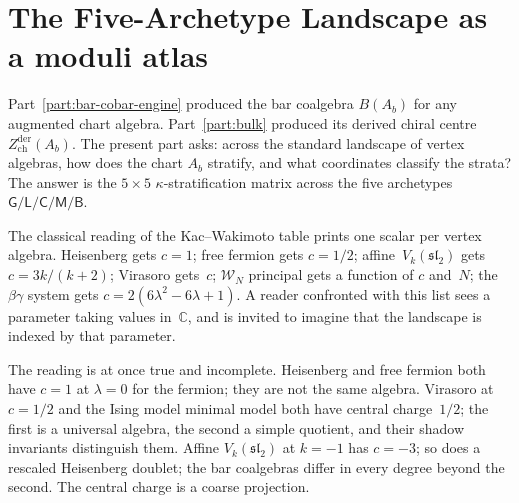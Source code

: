 
\providecommand{\cA}{\mathcal{A}}
\providecommand{\cH}{\mathcal{H}}
\providecommand{\cM}{\mathcal{M}}
\providecommand{\cW}{\mathcal{W}}
\providecommand{\Walg}{\mathcal{W}}
\providecommand{\fg}{\mathfrak{g}}
\providecommand{\fsl}{\mathfrak{sl}}
\providecommand{\Vir}{\mathrm{Vir}}
\providecommand{\GRT}{\mathrm{GRT}_1}
\providecommand{\Q}{\mathbb{Q}}
\providecommand{\Z}{\mathbb{Z}}
\providecommand{\ChirAlg}{\mathrm{ChirAlg}}
\providecommand{\Einf}{E_\infty}
\providecommand{\Eone}{E_1}
\providecommand{\Etwo}{E_2}
\providecommand{\MC}{\mathrm{MC}}

\chapter{The Five-Archetype Landscape as a moduli atlas}
\label{ch:part-iii-platonic-introduction}

Part~\ref{part:bar-cobar-engine} produced the bar coalgebra $B(A_b)$
for any augmented chart algebra. Part~\ref{part:bulk} produced its
derived chiral centre $Z^{\mathrm{der}}_{\mathrm{ch}}(A_b)$. The
present part asks: across the standard landscape of vertex algebras,
how does the chart $A_b$ stratify, and what coordinates classify the
strata? The answer is the $5{\times}5$ $\kappa$-stratification matrix
across the five archetypes
$\mathsf G/\mathsf L/\mathsf C/\mathsf M/\mathsf B$.

The classical reading of the Kac--Wakimoto table prints one scalar per
vertex algebra. Heisenberg gets $c=1$; free fermion gets $c=1/2$;
affine~$V_k(\fsl_2)$ gets $c = 3k/(k+2)$; Virasoro gets~$c$;
$\cW_N$ principal gets a function of $c$ and~$N$; the $\beta\gamma$
system gets $c = 2(6\lambda^2 - 6\lambda + 1)$. A reader confronted
with this list sees a parameter taking values in~$\mathbb{C}$, and is
invited to imagine that the landscape is indexed by that parameter.

The reading is at once true and incomplete. Heisenberg and free
fermion both have $c=1$ at $\lambda = 0$ for the fermion; they are
not the same algebra. Virasoro at $c=1/2$ and the Ising model
minimal model both have central charge~$1/2$; the first is a universal
algebra, the second a simple quotient, and their shadow invariants
distinguish them. Affine $V_k(\fsl_2)$ at $k = -1$ has $c = -3$; so
does a rescaled Heisenberg doublet; the bar coalgebras differ in
every degree beyond the second. The central charge is a coarse
projection.

